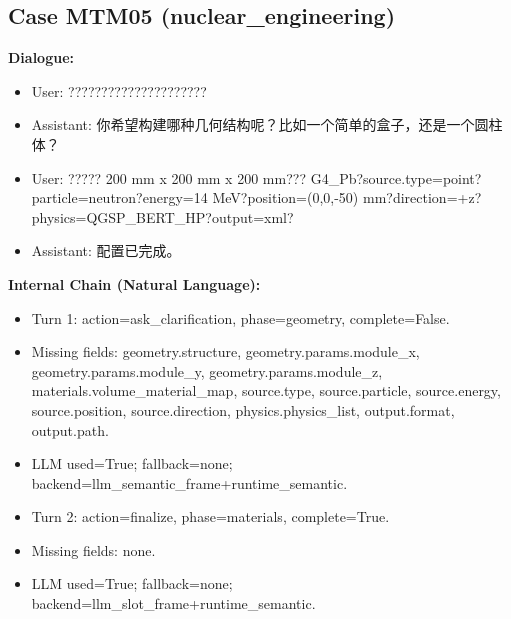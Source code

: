 \documentclass[11pt]{ctexart}
\begin{document}
\subsection{Case MTM05 (nuclear\_engineering)}
\textbf{Dialogue:}
\begin{itemize}
\item User: ?????????????????????
\item Assistant: 你希望构建哪种几何结构呢？比如一个简单的盒子，还是一个圆柱体？
\item User: ????? 200 mm x 200 mm x 200 mm??? G4\_Pb?source.type=point?particle=neutron?energy=14 MeV?position=(0,0,-50) mm?direction=+z?physics=QGSP\_BERT\_HP?output=xml?
\item Assistant: 配置已完成。
\end{itemize}
\textbf{Internal Chain (Natural Language):}
\begin{itemize}
\item Turn 1: action=ask\_clarification, phase=geometry, complete=False.
\item Missing fields: geometry.structure, geometry.params.module\_x, geometry.params.module\_y, geometry.params.module\_z, materials.volume\_material\_map, source.type, source.particle, source.energy, source.position, source.direction, physics.physics\_list, output.format, output.path.
\item LLM used=True; fallback=none; backend=llm\_semantic\_frame+runtime\_semantic.
\item Turn 2: action=finalize, phase=materials, complete=True.
\item Missing fields: none.
\item LLM used=True; fallback=none; backend=llm\_slot\_frame+runtime\_semantic.
\end{itemize}
\end{document}
